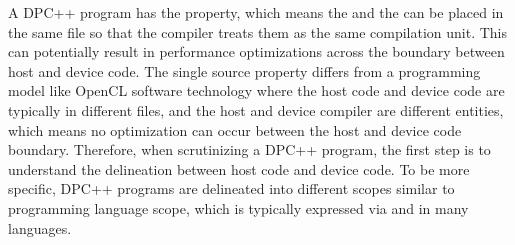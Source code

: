\documentclass[letterpaper,10pt,english]{sphinxmanual}
\begin{document}
\begin{sphinxVerbatim}[commandchars=\\\{\},numbers=left,firstnumber=1,stepnumber=1]
  
   \PYG{p}{[}\PYG{p}{]} \PYG{p}{[}\PYG{p}{]} \PYG{p}{[}\PYG{p}{]}

         
    \PYG{p}{[}\PYG{p}{]}  
    \PYG{p}{[}\PYG{p}{]}  
    \PYG{p}{[}\PYG{p}{]}  

    

   
\end{sphinxVerbatim}

A DPC++ program has the {\hyperref[\detokenize{glossary:term-single-source}]{}} property, which means
the {\hyperref[\detokenize{glossary:term-host-code}]{}} and the {\hyperref[\detokenize{glossary:term-device-code}]{}} can be placed in
the same file so that the compiler treats them as the same compilation
unit. This can potentially result in performance optimizations across
the boundary between host and device code. The single source property
differs from a programming model like OpenCL software technology where
the host code and device code are typically in different files, and
the host and device compiler are different entities, which means no
optimization can occur between the host and device code
boundary. Therefore, when scrutinizing a DPC++ program, the first step
is to understand the delineation between host code and device code. To
be more specific, DPC++ programs are delineated into different scopes
similar to programming language scope, which is typically expressed
via \sphinxcode{\sphinxupquote{\{}} and \sphinxcode{\sphinxupquote{\}}} in many languages.
\end{document}

